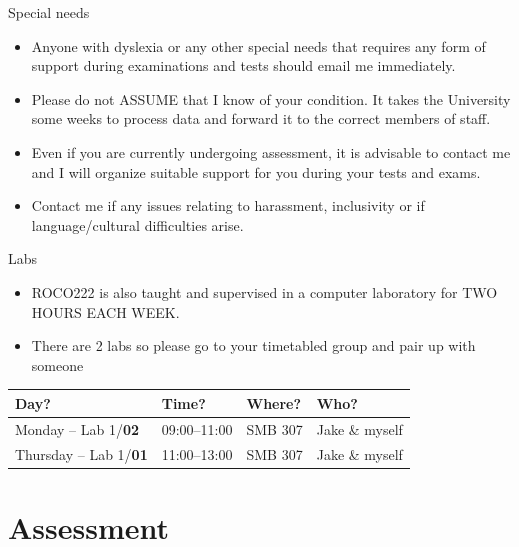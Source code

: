 \documentclass[compress]{beamer}
\begin{document}
\begin{frame}{Special needs}

    \begin{itemize}

    \item Anyone with dyslexia or any other special needs that requires any form
        of support during examinations and tests should email me immediately.

    \item Please do not ASSUME that I know of your condition. It takes the
        University some weeks to process data and forward it to the correct
            members of staff.

    \item Even if you are currently undergoing assessment, it is advisable to
        contact me and I will organize suitable support for you during your
            tests and exams.

    \item Contact me if any issues relating to harassment, inclusivity or if
        language/cultural difficulties arise.

    \end{itemize}
\end{frame}

\begin{frame}{Labs}
    \begin{itemize}
        \item ROCO222 is also taught and supervised in a computer laboratory for
            TWO HOURS EACH WEEK.
        \item There are 2 labs so please go to your timetabled group and pair up
            with someone
    \end{itemize}

    \centering
          \begin{tabular}{@{}llll@{}}
                \toprule
                Day?                & Time? & Where?   & Who? \\ \midrule
                Monday -- Lab 1/\textbf{02} & 09:00--11:00     & SMB 307  & Jake \& myself            \\
                Thursday -- Lab 1/\textbf{01} & 11:00--13:00     & SMB 307  & Jake \& myself          \\ \bottomrule
            \end{tabular}


\end{frame}

\section[]{Assessment}
\end{document}
